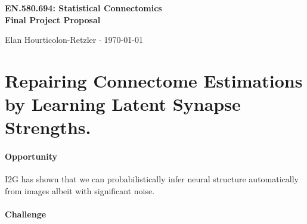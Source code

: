 \documentclass[12pt]{article}
\newcommand{\todo}[1]{{\color{red}{\it TODO: #1}}}
\begin{document}
\begin{center}\Large \bf EN.580.694: Statistical Connectomics \\ Final Project Proposal \end{center}
\begin{center} Elan Hourticolon-Retzler $\cdot$  \today \end{center}
\bigskip


\section*{Repairing Connectome Estimations by Learning Latent Synapse Strengths.} %

\paragraph{Opportunity}

I2G has shown that we can probabilistically infer neural structure automatically from images albeit with significant noise.

\paragraph{Challenge}
\end{document}
